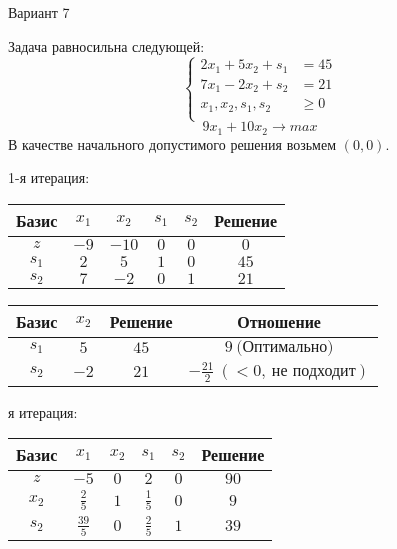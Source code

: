 \documentclass{article}%
\begin{document}
\newpage%
\begin{center}%
\begin{Huge}%
Вариант 7%
\end{Huge}%
\end{center}%
Задача равносильна следующей: %
\[%
\left\{\begin{aligned}2x_{1}+5x_{2}+s_{1} & =45 \\7x_{1}-2x_{2}+s_{2} & =21 \\x_{1},x_{2},s_{1},s_{2} & \ge 0 \\ \end{aligned}\right.%
\]%
\[%
9x_{1}+10x_{2}  \to max%
\]%
В качестве начального допустимого решения возьмем %
$(0, 0).$%
\begin{flushleft}%
1{-}я итерация: %
\newline%
\newline%
\renewcommand{\arraystretch}{1.3}%
\begin{tabular}{|c|cccc|c|}%
\hline%
Базис&$x_{1}$&$x_{2}$&$s_{1}$&$s_{2}$&Решение\\%
\hline%
$z$&$-9$&$-10$&$0$&$0$&$0$\\%
\hline%
$s_{1}$&$2$&$5$&$1$&$0$&$45$\\%
$s_{2}$&$7$&$-2$&$0$&$1$&$21$\\%
\hline%
\end{tabular}%
\newline%
\newline%
\newline%
\begin{tabular}{|cccc|}%
\hline%
Базис&$x_{2}$&Решение&Отношение\\%
\hline%
$s_{1}$&$5$&$45$&$9\: \text{(Оптимально)}$\\%
$s_{2}$&$-2$&$21$&$-\frac{21}{2}\: (< 0, \: \text{не подходит})$\\%
\hline%
\end{tabular}%
\newline%
\newline%
я итерация: %
\newline%
\newline%
\renewcommand{\arraystretch}{1.3}%
\begin{tabular}{|c|cccc|c|}%
\hline%
Базис&$x_{1}$&$x_{2}$&$s_{1}$&$s_{2}$&Решение\\%
\hline%
$z$&$-5$&$0$&$2$&$0$&$90$\\%
\hline%
$x_{2}$&$\frac{2}{5}$&$1$&$\frac{1}{5}$&$0$&$9$\\%
$s_{2}$&$\frac{39}{5}$&$0$&$\frac{2}{5}$&$1$&$39$\\%

\end{tabular}
\end{flushleft}
\end{document}
